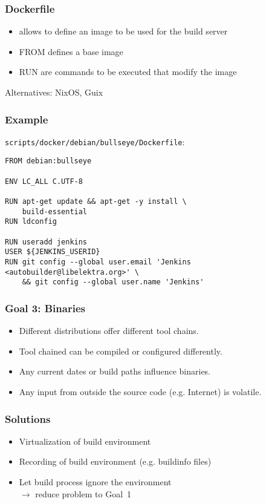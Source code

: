 \begin{frame}
	\frametitle{Dockerfile}

	\begin{itemize}[<+-| alert@+>]

	\item allows to define an image to be used for the build server
	\item FROM defines a base image
	\item RUN are commands to be executed that modify the image
	\end{itemize}

	\vspace{1cm}

	Alternatives: NixOS, Guix
\end{frame}

\begin{frame}[fragile]
	\frametitle{Example}

	\verb+scripts/docker/debian/bullseye/Dockerfile+:

	\begin{lstlisting}[language=docker]
FROM debian:bullseye

ENV LC_ALL C.UTF-8

RUN apt-get update && apt-get -y install \
    build-essential
RUN ldconfig

RUN useradd jenkins
USER ${JENKINS_USERID}
RUN git config --global user.email 'Jenkins <autobuilder@libelektra.org>' \
    && git config --global user.name 'Jenkins' \end{lstlisting}
\end{frame}

\begin{frame}
	\frametitle{Goal 3: Binaries}

	\begin{problem}
	\begin{itemize}[<+-| alert@+>]

	\item Different distributions offer different tool chains.
	\item Tool chained can be compiled or configured differently.
	\item Any current dates or build paths influence binaries.
	\item Any input from outside the source code (e.g. Internet) is volatile.
	\end{itemize}
	\end{problem}
\end{frame}

\begin{frame}
	\frametitle{Solutions}

	\begin{itemize}[<+-| alert@+>]

	\item Virtualization of build environment
	\item Recording of build environment (e.g. buildinfo files)
	\item Let build process ignore the environment \\
		$\rightarrow$ reduce problem to Goal~1
	\end{itemize}
\end{frame}

